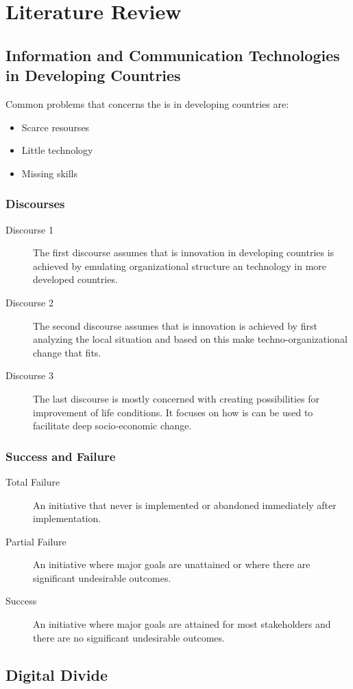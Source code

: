 \chapter{Literature Review}

\section{Information and Communication Technologies in Developing Countries}

Common problems that concerns the \gls{is} in developing countries are:
\begin{itemize}
\item Scarce resourses
\item Little technology
\item Missing skills
\end{itemize}

\subsection{Discourses}
\begin{description}
\item[Discourse 1]
	The first discourse assumes that \gls{is} innovation in developing countries is achieved by emulating organizational structure an technology in more developed countries. 
\item[Discourse 2]
	The second discourse assumes that \gls{is} innovation is achieved by first analyzing the local situation and based on this make techno-organizational change that fits.
\item[Discourse 3]
	The last discourse is mostly concerned with creating possibilities for improvement of life conditions. It focuses on how \gls{is} can be used to facilitate deep socio-economic change.
\end{description}

\subsection{Success and Failure}
\begin{description}
\item[Total Failure] An initiative that never is implemented or abandoned immediately after implementation.
\item[Partial Failure] An initiative where major goals are unattained or where there are significant undesirable outcomes.
\item[Success] An initiative where major goals are attained for most stakeholders and there are no significant undesirable outcomes.
\end{description}


\cite{ca:isdc}
\cite{rh:isdc}


\section{Digital Divide}